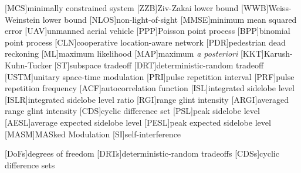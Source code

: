 [MCS]{minimally constrained system}
[ZZB]{Ziv-Zakai lower bound}
[WWB]{Weiss-Weinstein lower bound}
[NLOS]{non-light-of-sight}
[MMSE]{minimum mean squared error}
[UAV]{unmanned aerial vehicle}
[PPP]{Poisson point process}
[BPP]{binomial point process}
[CLN]{cooperative location-aware network}
[PDR]{pedestrian dead reckoning}
[ML]{maximum likelihood}
[MAP]{maximum \textit{a posteriori}}
[KKT]{Karush-Kuhn-Tucker}
[ST]{subspace tradeoff}
[DRT]{deterministic-random tradeoff}
[USTM]{unitary space-time modulation}
[PRI]{pulse repetition interval}
[PRF]{pulse repetition frequency}
[ACF]{autocorrelation function}
[ISL]{integrated sidelobe level}
[ISLR]{integrated sidelobe level ratio}
[RGI]{range glint intensity}
[ARGI]{averaged range glint intensity}
[CDS]{cyclic difference set}
[PSL]{peak sidelobe level}
[AESL]{average expected sidelobe level}
[PESL]{peak expected sidelobe level}
[MASM]{MASked Modulation}
[SI]{self-interference}

[DoFs]{degrees of freedom}
[DRTs]{deterministic-random tradeoffs}
[CDSs]{cyclic difference sets}

\newcommand{\bilink}[2]{#1\leftrightarrow #2}
\newcommand{\pdop}[1]{\frac{\partial}{\partial #1}}
\newcommand{\pd}[2]{\frac{\partial #1}{\partial #2}}
\newcommand{\argmin}{\mathop{\rm argmin}}
\newcommand{\efim}[1]{\M{J}_{\rm e}(#1)}
\newcommand{\invefim}[1]{\M{J}_{\rm e}^{-1}(#1)}
\newcommand{\refim}[1]{\RM{J}_{\rm e}(#1)}
\newcommand{\invrefim}[1]{\RM{J}_{\rm e}^{-1}(#1)}
